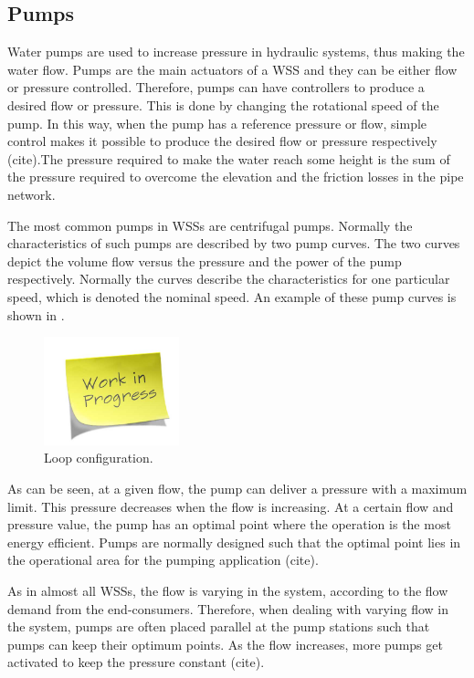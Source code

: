 \subsection{Pumps}
\label{pumps}

Water pumps are used to increase pressure in hydraulic systems, thus making the water flow. Pumps are the main actuators of a WSS and they can be either flow or pressure controlled. Therefore, pumps can have controllers to produce a desired flow or pressure. This is done by changing the rotational speed of the pump. In this way, when the pump has a reference pressure or flow, simple control makes it possible to produce the desired flow or pressure respectively (cite).The pressure required to make the water reach some height is the sum of the pressure required to overcome the elevation and the friction losses in the pipe network. 

The most common pumps in WSSs are centrifugal pumps. Normally the characteristics of such pumps are described by two pump curves. The two curves depict the volume flow versus the pressure and the power of the pump respectively. Normally the curves describe the characteristics for one particular speed, which is denoted the nominal speed. An example of these pump curves is shown in .

\begin{figure}[H]
\centering
\includegraphics[width=0.35\textwidth]{report/pictures/missingfigure}
\caption{Loop configuration.}
\label{fig:pump curves}
\end{figure}

As can be seen, at a given flow, the pump can deliver a pressure with a maximum limit. This pressure decreases when the flow is increasing. At a certain flow and pressure value, the pump has an optimal point where the operation is the most energy efficient. Pumps are normally designed such that the optimal point lies in the operational area for the pumping application (cite). 

As in almost all WSSs, the flow is varying in the system, according to the flow demand from the end-consumers. Therefore, when dealing with varying flow in the system, pumps are often placed parallel at the pump stations such that pumps can keep their optimum points. As the flow increases, more pumps get activated to keep the pressure constant (cite). 

